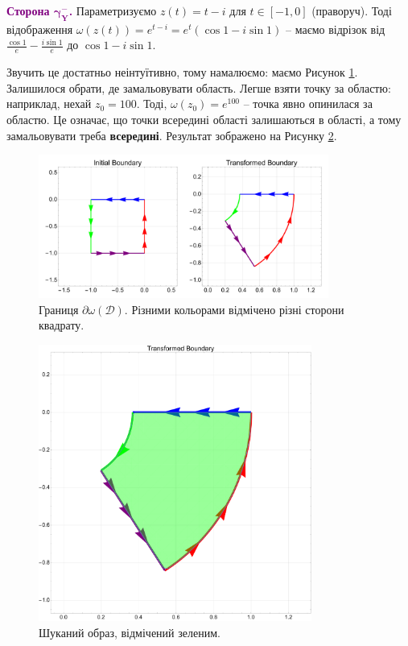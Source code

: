 \documentclass[oneside,solution]{karazin-complan-assign}
\begin{document}
\textcolor{purple}{\textbf{Сторона $\boldsymbol{\gamma_Y^-}$.}} Параметризуємо $z(t) = t - i$ для $t \in [-1,0]$ (праворуч). Тоді відображення $\omega(z(t))=e^{t-i} = e^t(\cos 1 - i \sin 1)$ -- маємо відрізок від $\frac{\cos 1}{e} - \frac{i \sin 1}{e}$ до $\cos 1 - i \sin 1$.

Звучить це достатньо неінтуїтивно, тому намалюємо: маємо Рисунок \ref{fig:2(1)}. Залишилося обрати, де замальовувати область. Легше взяти точку за областю: наприклад, нехай $z_0=100$. Тоді, $\omega(z_0)=e^{100}$ -- точка явно опинилася за областю. Це означає, що точки всередині області залишаються в області, а тому замальовувати треба \textbf{всередині}. Результат зображено на Рисунку \ref{fig:2(2)}.

\begin{figure}
    \centering
    \includegraphics[width=0.85\textwidth]{images/hw_5/problem_2(1).pdf}
    \caption{Границя $\partial\omega(\mathcal{D})$. Різними кольорами відмічено різні сторони квадрату.}
    \label{fig:2(1)}
\end{figure}

\begin{figure}
    \centering
    \includegraphics[width=0.8\textwidth]{images/hw_5/problem_2(2).pdf}
    \caption{Шуканий образ, відмічений зеленим.}
    \label{fig:2(2)}
\end{figure}
\end{document}
